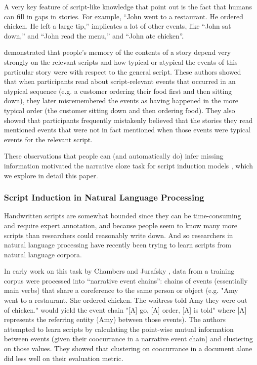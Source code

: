 \documentclass[10pt,a4paper]{article}
\begin{document}
A very key feature of script-like knowledge that  point out is the fact that humans can fill in gaps in stories. For example, “John went to a restaurant. He ordered chicken. He left a large tip,” implicates a lot of other events, like “John sat down,” and “John read the menu,” and “John ate chicken”.

 demonstrated that people’s memory of the contents of a story depend very strongly on the relevant scripts and how typical or atypical the events of this particular story were with respect to the general script. These authors showed that when participants read about script-relevant events that occurred in an atypical sequence (e.g. a customer ordering their food first and then sitting down), they later misremembered the events as having happened in the more typical order (the customer sitting down and then ordering food). They also showed that participants frequently mistakenly believed that the stories they read mentioned events that were not in fact mentioned when those events were typical events for the relevant script.

These observations that people can (and automatically do) infer missing information motivated the narrative cloze task for script induction models \cite{chambers2008unsupervised}, which we explore in detail this paper.

\subsubsection{Script Induction in Natural Language Processing}

Handwritten scripts are somewhat bounded since they can be time-consuming and require expert annotation, and because  people seem to know many more scripts than researchers could reasonably write down. And so researchers in natural language processing have recently been trying to learn scripts from natural language corpora.

In early work on this task by Chambers and Jurafsky , data from a training corpus were processed into “narrative event chains”: chains of events (essentially main verbs) that share a coreference to the same person or object (e.g. "Amy went to a restaurant. She ordered chicken. The waitress told Amy they were out of chicken." would yield the event chain "[A] go, [A] order, [A] is told" where [A] represents the referring entity (Amy) between those events). The authors attempted to learn scripts by calculating the point-wise mutual information between events (given their coocurrance in a narrative event chain) and clustering on those values. They showed that clustering on coocurrance in a document alone did less well on their evaluation metric.
\end{document}

